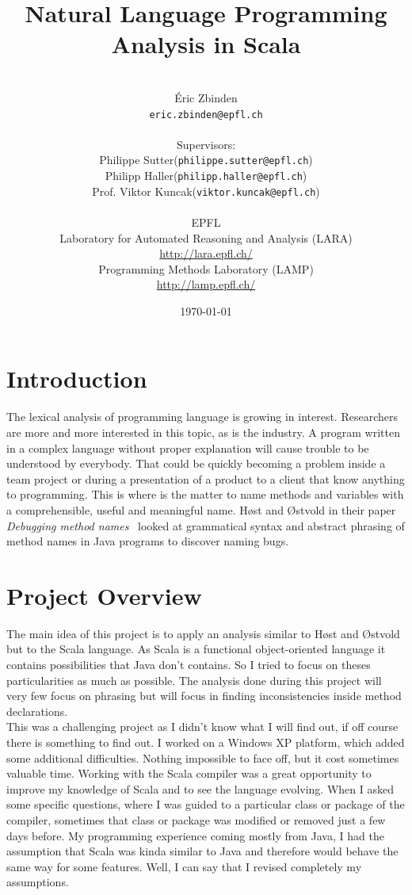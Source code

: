 \documentclass[12pt]{article}
\title{Natural Language Programming Analysis in Scala}
\author{\\ \'Eric Zbinden \\ \texttt{eric.zbinden@epfl.ch} \\ \\ Supervisors: \\Philippe Sutter(\texttt{philippe.sutter@epfl.ch})\\ Philipp Haller(\texttt{philipp.haller@epfl.ch})\\Prof. Viktor Kuncak(\texttt{viktor.kuncak@epfl.ch}) \\ \\ EPFL\\ Laboratory for Automated Reasoning and Analysis (LARA) \\ \url{http://lara.epfl.ch/}\\ Programming Methods Laboratory (LAMP) \\ \url{http://lamp.epfl.ch/} }
\date{\today}
\begin{document}
\maketitle
\newpage
\tableofcontents
\newpage

\section{Introduction}
The lexical analysis of programming language is growing in interest. Researchers are more and more interested in this topic, as is the industry. A program written in a complex language without proper explanation will cause trouble to be understood by everybody. That could be quickly becoming a problem inside a team project or during a presentation of a product to a client that know anything to programming. This is where is the matter to name methods and variables with a comprehensible, useful and meaningful name.  H{\o}st and {\O}stvold in their paper \textit{Debugging method names}~\cite{DebugMN} looked at grammatical syntax and abstract phrasing of method names in Java programs to discover naming bugs.

\section {Project Overview}
The main idea of this project is to apply an analysis similar to H{\o}st and {\O}stvold~\cite{DebugMN} but to the Scala language. As Scala is a functional object-oriented language it contains possibilities that Java don't contains. So I tried to focus on theses particularities as much as possible. The analysis done during this project will very few focus on phrasing but will focus in finding inconsistencies inside method declarations.\\

This was a challenging project as I didn't know what I will find out, if off course there is something to find out.
I worked on a Windows XP platform, which added some additional difficulties. Nothing impossible to face off, but it cost sometimes valuable time. Working with the Scala compiler was a great opportunity to improve my knowledge of Scala and to see the language evolving. When I asked some specific questions, where I was guided to a particular class or package of the compiler, sometimes that class or package was modified or removed just a few days before. My programming experience coming mostly from Java, I had the assumption that Scala was kinda similar to Java and therefore would behave the same way for some features. Well, I can say that I revised completely my assumptions. 
\newpage
\end{document}
